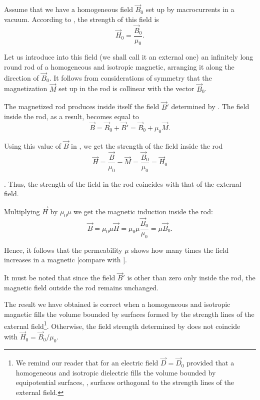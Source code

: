 Assume that we have a homogeneous field $\vec{B}_0$ set up by macrocurrents in a vacuum.
According to , the strength of this field is
\begin{equation}\label{eq:7_24}
    \vec{H}_0 = \frac{\vec{B}_0}{\mu_0}.
\end{equation}

\noindent
Let us introduce into this field (we shall call it an external one) an infinitely long round rod of a homogeneous and isotropic magnetic, arranging it along the direction of $\vec{B}_0$.
It follows from considerations of symmetry that the magnetization $\vec{M}$ set up in the rod is collinear with the vector $\vec{B}_0$.

The magnetized rod produces inside itself the field $\vec{B}'$ determined by .
The field inside the rod, as a result, becomes equal to
\begin{equation}\label{eq:7_25}
    \vec{B} = \vec{B}_0 + \vec{B}' = \vec{B}_0 + \mu_0 \vec{M}.
\end{equation}

\noindent
Using this value of $\vec{B}$ in , we get the strength of the field inside the rod
\begin{equation*}
    \vec{H} = \frac{\vec{B}}{\mu_0} - \vec{M} = \frac{\vec{B}_0}{\mu_0} = \vec{H}_0
\end{equation*}

. Thus, the strength of the field in the rod coincides with that of the external field.

Multiplying $\vec{H}$ by $\mu_0\mu$ we get the magnetic induction inside the rod:
\begin{equation}\label{eq:7_26}
    \vec{B} = \mu_0\mu\vec{H} = \mu_0\mu \frac{\vec{B}_0}{\mu_0} = \mu \vec{B}_0.
\end{equation}

\noindent
Hence, it follows that the permeability $\mu$ shows how many times the field increases in a magnetic [compare with ].

It must be noted that since the field $\vec{B}'$ is other than zero only inside the rod, the magnetic field outside the rod remains unchanged.

The result we have obtained is correct when a homogeneous and isotropic magnetic fills the volume bounded by surfaces formed by the strength lines of the external field\footnote{We remind our reader that for an electric field $\vec{D} = \vec{D}_0$ provided that a homogeneous and isotropic dielectric fills the volume bounded by equipotential surfaces, \ie, surfaces orthogonal to the strength lines of the external field.}.
Otherwise, the field strength determined by  does not coincide with $\vec{H}_0=\vec{B}_0/\mu_0$.

